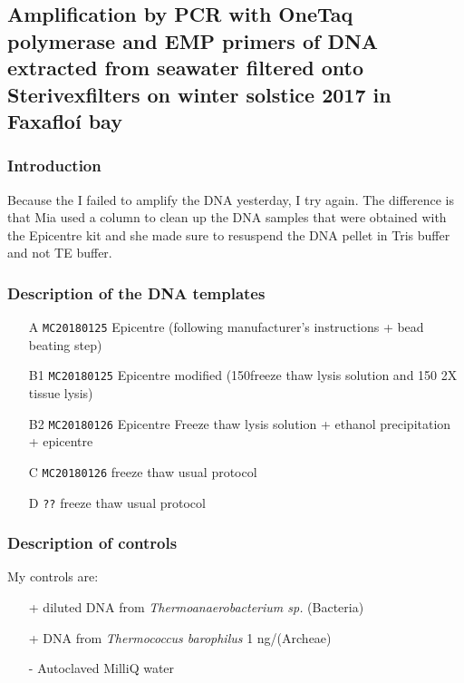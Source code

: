 \subsection{Amplification by PCR with OneTaq\cR~ polymerase and EMP primers of DNA extracted from seawater filtered onto Sterivex\texttrademark filters on winter solstice 2017 in Faxafloí bay}
\label{task:20180201_cj1}

\subsubsection{Introduction}
Because the I failed to amplify the DNA yesterday, I try again. The difference is that Mia used a column to clean up the DNA samples that were obtained with the Epicentre kit and she made sure to resuspend the DNA pellet in Tris buffer and not TE buffer.

\subsubsection{Description of the DNA templates}
\begin{itemize}
\item[A] \texttt{MC20180125} Epicentre (following manufacturer's instructions + bead beating step)
\item[B1] \texttt{MC20180125} Epicentre modified (150\uL freeze thaw lysis solution and 150 \uL 2X tissue lysis)
\item[B2] \texttt{MC20180126} Epicentre Freeze thaw lysis solution + ethanol precipitation + epicentre
\item[C] \texttt{MC20180126} freeze thaw usual protocol
\item[D] \texttt{??} freeze thaw usual protocol
\end{itemize}


\subsubsection{Description of controls}
My controls are:
\begin{itemize}
\item[+] diluted DNA from \textit{Thermoanaerobacterium sp.} (Bacteria)
\item[+] DNA from \textit{Thermococcus barophilus} 1 ng/\uL (Archeae)
\item[-] Autoclaved MilliQ water
\end{itemize}

